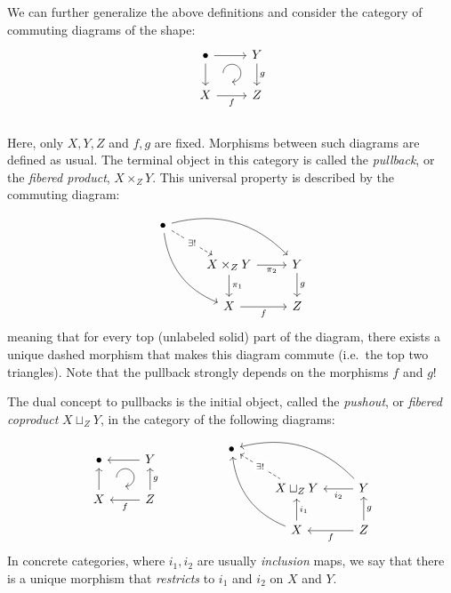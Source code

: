 %
\begin{defn}[Pullbacks]\label{pullbacks}
We can further generalize the above definitions and consider the
category of commuting diagrams of the shape: \[\begin{tikzcd}[every matrix/.append style={name=m},   
execute at end picture={\draw [<-] ([xshift=-7mm,yshift=1mm]m-2-2.north) arc[start angle=-90,delta angle=270,radius=0.25cm];}]
   \bullet \arrow[r]\arrow[d]& Y\arrow[d,"g"] \\
   X\arrow[r,swap,"f"]& Z\\
\end{tikzcd}\]
Here, only $X,Y,Z$ and $f,g$ are fixed. Morphisms between such diagrams
are defined as usual. The terminal object in this category is called
the \emph{pullback}, or the \emph{fibered product}, $X\times_{Z}Y$.
This universal property is described by the commuting diagram:\[\begin{tikzcd}
  \bullet   \arrow[drr, bend left]   \arrow[ddr, bend right]   \arrow[dr, dashed,"\exists!" description] & & \\
    & X \times_Z Y \arrow[r,swap, "\pi_2"] \arrow[d, "\pi_1"]       & Y \arrow[d, "g"] \\ & X \arrow[r,swap, "f"] &Z 
\end{tikzcd}\]meaning that for every top (unlabeled solid) part of the diagram,
there exists a unique dashed morphism that makes this diagram commute
(i.e.\ the top two triangles). Note that the pullback strongly depends
on the morphisms $f$ and $g$!
\end{defn}
%
\begin{defn}[Pushouts]\label{pushouts}
The dual concept to pullbacks is the initial object, called the \emph{pushout}, or \emph{fibered coproduct} $X\sqcup_{Z}Y$, in the category of the following diagrams:
\[\begin{tikzcd}[every matrix/.append style={name=m},   
execute at end picture={\draw [<-] ([xshift=-7mm,yshift=1mm]m-2-2.north) arc[start angle=-90,delta angle=270,radius=0.25cm];}]
   \bullet \arrow[r,leftarrow]\arrow[d,leftarrow]& Y\arrow[d,leftarrow,"g"] \\
   X\arrow[r,,leftarrow,swap,"f"]& Z\\
\end{tikzcd}\quad\quad\quad\quad\quad
\begin{tikzcd}
  \bullet   \arrow[drr,leftarrow, bend left]   \arrow[ddr,leftarrow, bend right]   \arrow[dr,leftarrow, dashed,"\exists!" description] & & \\
    & X \sqcup_Z Y \arrow[r,leftarrow,swap, "i_2"] \arrow[d,leftarrow, "i_1"]       & Y \arrow[d,leftarrow, "g"] \\ & X \arrow[r,leftarrow,swap, "f"] &Z 
\end{tikzcd}
\]
In concrete categories, where $i_1,i_2$ are usually \emph{inclusion} maps, we say that there is a unique morphism that \emph{restricts} to $i_1$ and $i_2$ on $X$ and $Y$.
\end{defn}
